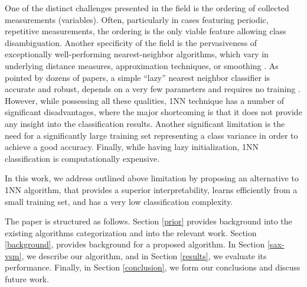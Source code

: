 \documentclass[conference]{IEEEtran}
\begin{document}
One of the distinct challenges presented in the field is the ordering of collected 
measurements (variables). Often, particularly in cases featuring periodic, 
repetitive measurements, the ordering is the only viable feature allowing 
class disambiguation. 
Another specificity of the field is the pervasiveness of exceptionally well-performing 
nearest-neighbor algorithms, which vary in underlying distance measures, 
approximation techniques, or smoothing \cite{comparison}. 
As pointed by dozens of papers, a simple ``lazy'' nearest neighbor classifier is 
accurate and robust, depends on a very few parameters and requires no 
training \cite{review, benchmark, comparison, classifiers}. 
However, while possessing all these qualities, 1NN technique has a number of 
significant disadvantages, where the major shortcoming is that it does not provide any 
insight into the classification results. 
Another significant limitation is the need for a significantly large training set 
representing a class variance in order to achieve a good accuracy. 
Finally, while having lazy initialization, 1NN classification is computationally expensive.

In this work, we address outlined above limitation by proposing an alternative 
to 1NN algorithm, that provides a superior interpretability, learns efficiently from a
small training set, and has a very low classification complexity.

The paper is structured as follows. 
Section \ref{prior} provides background into the existing algorithms categorization and into 
the relevant work. Section \ref{background}, provides background for a proposed algorithm. 
In Section \ref{sax-vsm}, we describe our algorithm, and in Section \ref{results}, we
evaluate its performance. Finally, in Section \ref{conclusion}, we form our conclusions 
and discuss future work.
\end{document}
